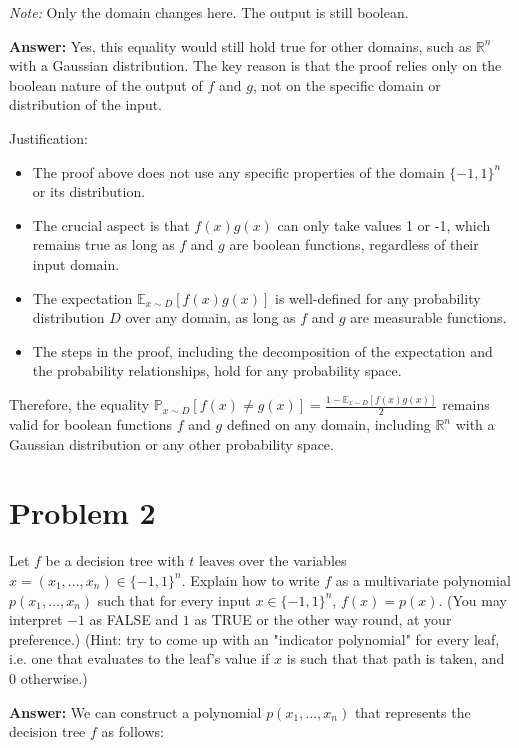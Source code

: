\documentclass{article}
\begin{document}
\begin{enumerate}
    \textit{Note:} Only the domain changes here. The output is still boolean.
    
    \textbf{Answer:} Yes, this equality would still hold true for other domains, such as $\mathbb{R}^n$ with a Gaussian distribution. The key reason is that the proof relies only on the boolean nature of the output of $f$ and $g$, not on the specific domain or distribution of the input.

    Justification:
    \begin{itemize}
        \item The proof above does not use any specific properties of the domain $\{-1,1\}^n$ or its distribution.
        \item The crucial aspect is that $f(x)g(x)$ can only take values 1 or -1, which remains true as long as $f$ and $g$ are boolean functions, regardless of their input domain.
        \item The expectation $\mathbb{E}_{x\sim D}[f(x)g(x)]$ is well-defined for any probability distribution $D$ over any domain, as long as $f$ and $g$ are measurable functions.
        \item The steps in the proof, including the decomposition of the expectation and the probability relationships, hold for any probability space.
    \end{itemize}

    Therefore, the equality $\mathbb{P}_{x\sim D}[f(x) \neq g(x)] = \frac{1 - \mathbb{E}_{x\sim D}[f(x)g(x)]}{2}$ remains valid for boolean functions $f$ and $g$ defined on any domain, including $\mathbb{R}^n$ with a Gaussian distribution or any other probability space.
\end{enumerate}

\section*{Problem 2}

\noindent [10 points] Let $f$ be a decision tree with $t$ leaves over the variables $x = (x_1,\ldots,x_n) \in \{-1,1\}^n$. Explain how to write $f$ as a multivariate polynomial $p(x_1,\ldots,x_n)$ such that for every input $x \in \{-1,1\}^n$, $f(x) = p(x)$. (You may interpret $-1$ as FALSE and $1$ as TRUE or the other way round, at your preference.) (Hint: try to come up with an "indicator polynomial" for every leaf, i.e. one that evaluates to the leaf's value if $x$ is such that that path is taken, and 0 otherwise.)

\textbf{Answer:} We can construct a polynomial $p(x_1,\ldots,x_n)$ that represents the decision tree $f$ as follows:
\end{document}
